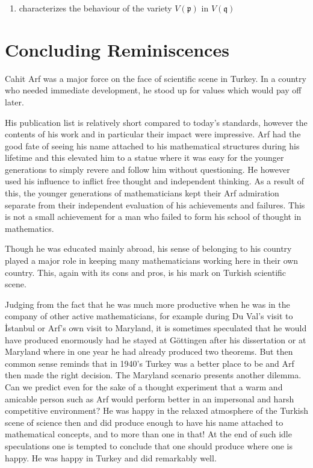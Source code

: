 \documentclass[12pt]{amsart}
\begin{document}
\begin{enumerate}
ring $\tilde{\mbox{\textscripta}}$ into $\mathit{k}'[[t_1,t_2,\dots,t_s]]$. I expect that the image of $\tilde{\mbox{\textscripta}}$ in $\mathit{k}'[[t_1,t_2,\dots,t_s]]$
\item
characterizes the behaviour of the variety $V({\mathfrak{p}})$ in $V({\mathfrak{q}})$
\end{enumerate}

\section{Concluding Reminiscences}
Cahit Arf was a major force on the face of scientific scene in Turkey. In a country who needed immediate development, he stood up for values which would pay off later.

His publication list is relatively short compared to today's standards, however the contents of his work and in particular their impact were impressive. Arf had the good fate of seeing his name  attached to his mathematical structures during his lifetime and this elevated him to a statue where it was easy for the younger generations to simply revere and follow him without questioning. He however used his influence to inflict free thought and independent thinking. As a result of this, the younger generations of mathematicians kept their Arf admiration separate from their independent evaluation of his achievements and failures. This is not a small achievement for a man who failed to form his school of thought in mathematics.

Though he was educated mainly abroad, his sense of belonging to his country played a major role in keeping many mathematicians working here in their own country. This, again with its cons and pros, is his mark on Turkish scientific scene.

Judging from the fact that he was much more productive when he was in the company of other active mathematicians, for example during Du Val's visit to {\.I}stanbul or Arf's own visit to Maryland, it is sometimes speculated that he would have produced enormously had he stayed at G\"{o}ttingen after his dissertation or at Maryland where in one year he had already produced two theorems. But then common sense reminds that in 1940's Turkey was a better place to be and Arf then made the right decision. The Maryland scenario presents another dilemma. Can we predict even for the sake of a thought experiment that a warm and amicable person such as Arf would perform better in an impersonal and harsh competitive environment? He was happy in the relaxed atmosphere of the Turkish scene of science then and did produce enough to have his name attached to mathematical concepts, and to more than one in that! At the end of such idle speculations one is tempted to conclude that one should produce where one is happy. He was happy in Turkey and did remarkably well.
\end{document}
